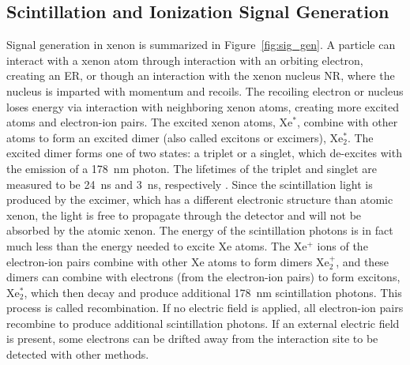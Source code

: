 \subsection{Scintillation and Ionization Signal Generation}
\label{sec:signal_generation}
Signal generation in xenon is summarized in Figure~\ref{fig:sig_gen}. A particle can interact with a xenon atom through interaction with an orbiting electron, creating an \ac{ER}, or though an interaction with the xenon nucleus \ac{NR}, where the nucleus is imparted with momentum and recoils. The recoiling electron or nucleus loses energy via interaction with neighboring xenon atoms, creating more excited atoms and electron-ion pairs. The excited xenon atoms, Xe$^{*}$, combine with other atoms to form an excited dimer (also called excitons or excimers), Xe$_{2}^{*}$. The excited dimer forms one of two states: a triplet or a singlet, which de-excites with the emission of a 178~nm photon. The lifetimes of the triplet and singlet are measured to be 24~ns and 3~ns, respectively \cite{Mock2014}. Since the scintillation light is produced by the excimer, which has a different electronic structure than atomic xenon, the light is free to propagate through the detector and will not be absorbed by the atomic xenon. The energy of the scintillation photons is in fact much less than the energy needed to excite Xe atoms. The Xe$^{+}$ ions of the electron-ion pairs combine with other Xe atoms to form dimers Xe$_{2}^{+}$, and these dimers can combine with electrons (from the electron-ion pairs) to form excitons, Xe$_{2}^{*}$, which then decay and produce additional 178~nm scintillation photons. This process is called recombination. If no electric field is applied, all electron-ion pairs recombine to produce additional scintillation photons. If an external electric field is present, some electrons can be drifted away from the interaction site to be detected with other methods. 

